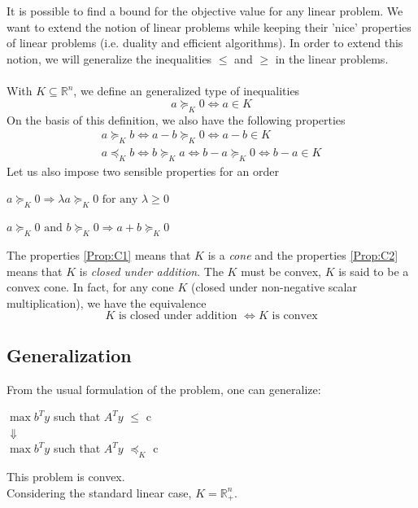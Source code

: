 \\ \\ It is possible to find a bound for the objective value for any linear problem. We want to extend the notion of linear problems while keeping their 'nice' properties of linear problems (i.e. duality and efficient algorithms). In order to extend this notion, we will generalize the inequalities $\leq$ and $\geq$ in the linear problems. \\ \\
With $K \subseteq \mathbb{R}^n$, we define an generalized type of inequalities\[ a \succeq_K 0
 \Leftrightarrow a \in K \]
On the basis of this definition, we also have the following properties \begin{align*}
 a \succeq_K b \Leftrightarrow a-b \succeq_K 0
\Leftrightarrow a-b \in K \\ a \preceq_K b
\Leftrightarrow b \succeq_K a \Leftrightarrow b-a \succeq_K 0
\Leftrightarrow b-a \in K \end{align*}
Let us also impose two sensible properties for an order

\begin{property}
\label{Prop:C1}
$a \succeq_K 0 \Rightarrow \lambda a \succeq_K 0 \text{ for any } \lambda \ge 0$ 
\end{property}
\begin{property}
\label{Prop:C2}
$a \succeq_K 0 \text{ and } b \succeq_K 0 \Rightarrow a+b \succeq_K 0$
\end{property}
The properties \ref{Prop:C1} means that $K$ is a \emph{cone} and the properties \ref{Prop:C2} means that $K$ is \emph{closed under addition}.
The $K$ must be convex, $K$ is said to be a convex cone. In fact, for any cone $K$ (closed under non-negative scalar multiplication), we have the equivalence
\[ K \text{ is closed under addition } \Leftrightarrow K \text{ is convex} \]

\subsection{Generalization}
From the usual formulation of the problem, one can generalize: 
\begin{center}$\max b^Ty$ such that $A^Ty$ $\leqslant$ c \\
$\Downarrow$ \\
$\max b^Ty$ such that $A^Ty$ $\preceq_K$ c
\end{center}
This problem is convex.\\
Considering the standard linear case, $K = \mathbb{R}^n_+$.

